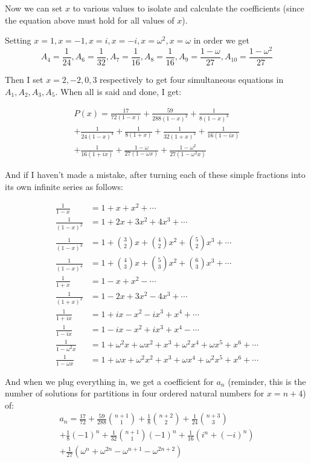 \documentclass{article}
\begin{document}
Now we can set $x$ to various values to isolate and calculate the coefficients (since the equation
above must hold for all values of $x$).

Setting $x=1, x=-1, x=i, x=-i, x=\omega^2, x=\omega$ in order we get 
\[
A_4 = \frac{1}{24}, A_6 = \frac{1}{32}, A_7 = \frac{1}{16}, A_8 = \frac{1}{16}, A_9 = \frac{1-\omega}{27}, A_{10} = \frac{1-\omega^2}{27}
\]

Then I set $x=2, -2, 0, 3$ respectively to get four simultaneous equations in $A_1, A_2, A_3, A_5$. When all is said and done, I get:

\begin{multline*}
	P(x) = \frac{17}{72(1-x)} + \frac{59}{288(1-x)^2} + \frac{1}{8(1-x)^3} \\
	+ \frac{1}{24(1-x)^4} + \frac{1}{8(1+x)} + \frac{1}{32(1+x)^2} + \frac{1}{16(1-ix)} \\
	+ \frac{1}{16(1+ix)} + \frac{1-\omega}{27(1-\omega x)} + \frac{1-\omega^2}{27(1-\omega^2 x)}
\end{multline*}

And if I haven’t made a mistake, after turning each of these simple fractions into its own
infinite series as follows:

\begin{align*}
\frac{1}{1-x} &= 1 + x + x^2 + \cdots \\
\frac{1}{(1-x)^2} &= 1 + 2x + 3x^2 + 4x^3 + \cdots \\
\frac{1}{(1-x)^3} &= 1 + \binom{3}{2}x + \binom{4}{2}x^2 + \binom{5}{2}x^3 + \cdots \\
\frac{1}{(1-x)^4} &= 1 + \binom{4}{3}x + \binom{5}{3}x^2 + \binom{6}{3}x^3 + \cdots \\
\frac{1}{1+x} &= 1 - x + x^2 - \cdots \\
\frac{1}{(1+x)^2} &= 1 - 2x + 3x^2 - 4x^3 + \cdots \\
\frac{1}{1+ix} &= 1 + ix - x^2 - ix^3 + x^4 + \cdots \\
\frac{1}{1-ix} &= 1 - ix - x^2 + ix^3 + x^4 - \cdots \\
\frac{1}{1-\omega^2 x} &= 1 + \omega^2 x + \omega x^2 + x^3 + \omega^2 x^4 + \omega x^5 + x^6 + \cdots \\
\frac{1}{1-\omega x} &= 1 + \omega x + \omega^2 x^2 + x^3 + \omega x^4 + \omega^2 x^5 + x^6 + \cdots
\end{align*}

And when we plug everything in, we get a coefficient for $a_n$ (reminder, this is the number of
solutions for partitions in four ordered natural numbers for $x=n+4$) of:
\begin{multline*}
a_n = \frac{17}{72} + \frac{59}{288}\binom{n+1}{1} + \frac{1}{8}\binom{n+2}{2} + \frac{1}{24}\binom{n+3}{3} \\
+ \frac{1}{8}(-1)^n + \frac{1}{32}\binom{n+1}{1}(-1)^n + \frac{1}{16}(i^n + (-i)^n) \\
+ \frac{1}{27}\left(\omega^{n} + \omega^{2n} - \omega^{n+1} - \omega^{2n+2}\right)
\end{multline*}
\end{document}
